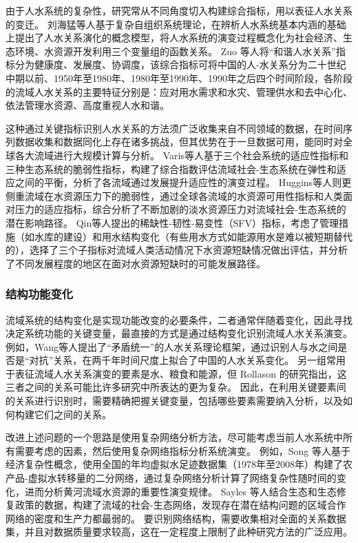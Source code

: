 由于人水系统的复杂性，研究常从不同角度切入构建综合指标，用以表征人水关系的变迁。
刘海猛等人基于复杂自组织系统理论，在辨析人水系统基本内涵的基础上提出了人水关系演化的概念模型，将人水系统的演变过程概念化为社会经济、生态环境、水资源开发利用三个变量组的函数关系\cite{liu2014}。
Zuo 等人将“和谐人水关系”指标分为健康度、发展度、协调度\cite{zuo2008}，该综合指标可将中国的人-水关系分为二十世纪中期以前、1950年至1980年、1980年至1990年、1990年之后四个时间阶段，各阶段的流域人水关系的主要特征分别是：应对用水需求和水灾、管理供水和去中心化、依法管理水资源、高度重视人水和谐\cite{zuo2016a}。

这种通过关键指标识别人水关系的方法须广泛收集来自不同领域的数据，在时间序列数据收集和数据同化上存在诸多挑战，但其优势在于一旦数据可用，能同时对全球各大流域进行大规模计算与分析。
Varis等人基于三个社会系统的适应性指标和三种生态系统的脆弱性指标，构建了综合指数评估流域社会-生态系统在弹性和适应之间的平衡，分析了各流域通过发展提升适应性的演变过程\cite{varis2019}。
Huggins等人则更侧重流域在水资源压力下的脆弱性，通过全球各流域的水资源可用性指标和人类面对压力的适应指标，综合分析了不断加剧的淡水资源压力对流域社会-生态系统的潜在影响路径\cite{huggins2022}。
Qin等人提出的稀缺性-韧性-易变性（SFV）指标，考虑了管理措施（如水库的建设）和用水结构变化（有些用水方式如能源用水是难以被短期替代的），选择了三个子指标对流域人类活动情况下水资源短缺情况做出评估，并分析了不同发展程度的地区在面对水资源短缺时的可能发展路径\cite{qin2019}。

\subsubsection*{结构功能变化}

流域系统的结构变化是实现功能改变的必要条件，二者通常伴随着变化，因此寻找决定系统功能的关键变量，最直接的方式是通过结构变化识别流域人水关系演变。
例如，Wang等人提出了“矛盾统一”的人水关系理论框架，通过识别人与水之间是否是“对抗”关系，在两千年时间尺度上拟合了中国的人水关系变化\cite{wang2017}。
另一组常用于表征流域人水关系演变的要素是水、粮食和能源，但 Rollason 的研究指出，这三者之间的关系可能比许多研究中所表达的更为复杂\cite{rollason2021}。
因此，在利用关键要素间的关系进行识别时，需要精确把握关键变量，包括哪些要素需要纳入分析，以及如何构建它们之间的关系\cite{zhangyongyong2020, wang2021}。

改进上述问题的一个思路是使用复杂网络分析方法，尽可能考虑当前人水系统中所有需要考虑的因素，然后使用复杂网络指标分析系统演变\cite{sayles2019, bodin2017b}。
例如，Song 等人基于经济复杂性概念，使用全国的年均虚拟水足迹数据集（1978年至2008年）构建了农产品-虚拟水转移量的二分网络，通过复杂网络分析计算了网络复杂性随时间的变化，进而分析黄河流域水资源的重要性演变规律\cite{song2022}。
Sayles 等人结合生态和生态修复政策的数据，构建了流域的社会-生态网络，发现存在潜在结构问题的区域合作网络的密度和生产力都最弱的\cite{sayles2017}。
要识别网络结构，需要收集相对全面的关系数据集，并且对数据质量要求较高，这在一定程度上限制了此种研究方法的广泛应用。

